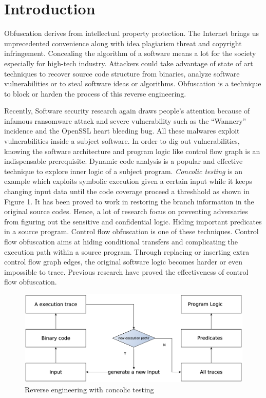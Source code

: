 \documentclass[lnicst]{svmultln}
\begin{document}
\section{Introduction}
%
Obfuscation derives from intellectual property protection. The Internet brings us unprecedented convenience along with idea plagiarism threat and copyright infringement.  Concealing the algorithm of a software means a lot for the society especially for high-tech industry. Attackers could take advantage of state of art techniques\cite{Loop}\cite{Lee}\cite{Molnar} to recover source code structure from binaries,  analyze software vulnerabilities or to steal software ideas or algorithms. Obfuscation is a technique to block or harden the process of this reverse engineering.

Recently, Software security research again draws people's attention because of infamous ransomware attack and severe vulnerability such as the ``Wanncry'' incidence and the OpenSSL heart bleeding bug. All these malwares exploit vulnerabilities inside a subject software. In order to dig out vulnerabilities, knowing the software architecture and program logic like control flow graph is an indispensable prerequisite. Dynamic code analysis is a popular and effective technique to explore inner logic of a subject program. \textit{Concolic testing} is an example which exploits symbolic execution given a certain input while it keeps changing input data until the code coverage proceed a threshhold\cite{Sen} as shown in Figure 1. It has been proved to work in restoring the branch information in the original source codes. Hence, a lot of research focus on preventing adversaries from figuring out the sensitive and confidential logic. Hiding important predicates in a source program. Control flow obfuscation is one of these techniques. Control flow obfuscation aims at hiding conditional transfers and complicating the execution path within a source program. Through replacing or inserting extra control flow graph edges, the original software logic becomes harder or even impossible to trace. Previous research\cite{Ma} have proved the effectiveness of control flow obfuscation.

\begin{figure}
  \includegraphics[width=0.9\linewidth]{reverse_engineering.eps}
  \caption{Reverse engineering with concolic testing}
  \label{Figure 1}
\end{figure}
\end{document}
